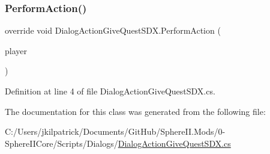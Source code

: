\subsubsection{\texorpdfstring{PerformAction()}{PerformAction()}}
{\footnotesize\ttfamily override void Dialog\+Action\+Give\+Quest\+S\+D\+X.\+Perform\+Action (\begin{DoxyParamCaption}\item[{Entity\+Player}]{player }\end{DoxyParamCaption})}



Definition at line 4 of file Dialog\+Action\+Give\+Quest\+S\+D\+X.\+cs.



The documentation for this class was generated from the following file\+:\begin{DoxyCompactItemize}
\item 
C\+:/\+Users/jkilpatrick/\+Documents/\+Git\+Hub/\+Sphere\+I\+I.\+Mods/0-\/\+Sphere\+I\+I\+Core/\+Scripts/\+Dialogs/\mbox{\hyperlink{_dialog_action_give_quest_s_d_x_8cs}{Dialog\+Action\+Give\+Quest\+S\+D\+X.\+cs}}\end{DoxyCompactItemize}
